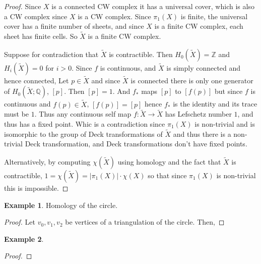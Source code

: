\documentclass[a4paper]{article}
\theoremstyle{theorem}
\theoremstyle{definition}
\newtheorem{example}{Example}
\theoremstyle{remark}
\theoremstyle{gremark}
\theoremstyle{discussion}
\theoremstyle{notation}
\begin{document}
\begin{proof}
	Since $X$ is a connected CW complex it has a universal cover, which is also a CW complex since $X$ is a CW complex. Since $\pi_1(X)$ is finite, the universal cover has a finite number of sheets, and since $X$ is a finite CW complex, each sheet has finite cells. So $\widetilde{X}$ is a finite CW complex. 
	\medbreak
	
	Suppose for contradiction that $\widetilde{X}$ is contractible. Then $H_0(\widetilde{X})=\mathbb{Z}$ and $H_i(\widetilde{X})=0$ for $i>0$. Since $f$ is continuous, and $\widetilde{X}$ is simply connected and hence connected,
	Let $p\in \widetilde{X}$ and since $\widetilde{X}$ is connected there is only one generator of $H_0(\widetilde{X};\mathbb{Q}) $, $[p]$. Then $[p]=1$. And $f_*$ maps $[p]$ to $[f(p)]$ but since $f$ is continuous and $f(p)\in\widetilde{X}$, $[f(p)]=[p]$ hence $f_*$ is the identity and its trace must be $1$.  	
	Thus any continuous self map $f:\widetilde{X}\to\widetilde{X}$ has Lefschetz number $1$, and thus has a fixed point.  
	Whic is a contradiction since $\pi_1(X)$ is non-trivial and is isomorphic to the group of Deck transformations of $\widetilde{X}$ and thus there is a non-trivial Deck transformation, and Deck transformations don't have fixed points. 
	
	Alternatively, by computing $\chi(\widetilde{X})$ using homology and the fact that $\widetilde{X}$ is contractible, $1=\chi(\widetilde{X})=|\pi_1(X)|\cdot \chi(X)$ so that since $\pi_1(X)$ is non-trivial this is impossible.
\end{proof}


\begin{example}
	Homology of the circle.
\end{example}

\begin{proof}
	Let $v_0,v_1,v_2$ be vertices of a triangulation of the circle. Then, 
\end{proof}

\begin{example}
	
\end{example}

\begin{proof}
	
\end{proof}


	
	
\end{document}
